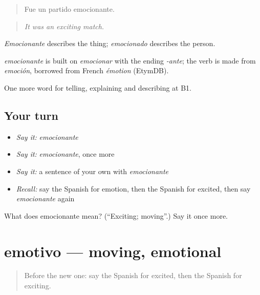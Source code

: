 \begin{quote}
Fue un partido emocionante.
\end{quote}

\begin{quote}
\emph{It was an exciting match.}
\end{quote}

\emph{Emocionante} describes the thing; \emph{emocionado} describes the person.

\begin{cousinweb}
\emph{emocionante} is built on \emph{emocionar} with the ending \emph{-ante}; the verb is made from \emph{emoción}, borrowed from French \emph{émotion} (EtymDB).
\end{cousinweb}

\begin{grammarlens}[title={What you've built}]
One more word for telling, explaining and describing at B1.
\end{grammarlens}

\subsection*{Your turn}
\begin{itemize}
\raggedright
  \item \emph{Say it:} \emph{emocionante}
  \item \emph{Say it:} \emph{emocionante}, once more
  \item \emph{Say it:} a sentence of your own with \emph{emocionante}
  \item \emph{Recall:} say the Spanish for emotion, then the Spanish for excited, then say \emph{emocionante} again
\end{itemize}

\begin{tcolorbox}[breakable,colback=teal!4,colframe=teal!35!black,title={Before you move on}]
What does emocionante mean? (\textquotedblleft{}Exciting; moving\textquotedblright{}.) Say it once more.
\end{tcolorbox}
\section[emotivo]{emotivo — moving, emotional}

\label{lesson:ES-C711-emotivo}



\begin{quote}
Before the new one: say the Spanish for excited, then the Spanish for exciting.
\end{quote}

